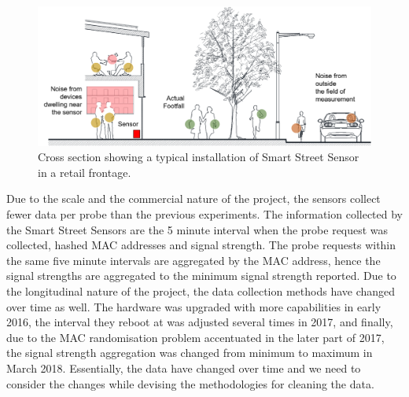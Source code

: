 \begin{figure}
  \includegraphics{images/sss.png}
  \caption{Cross section showing a typical installation of Smart Street Sensor in a retail frontage.}
  \label{figure:collection:sss:typical}
\end{figure}

Due to the scale and the commercial nature of the project, the sensors collect fewer data per probe than the previous experiments.
The information collected by the Smart Street Sensors are the 5 minute interval when the probe request was collected, hashed MAC addresses and signal strength.
The probe requests within the same five minute intervals are aggregated by the MAC address, hence the signal strengths are aggregated to the minimum signal strength reported. 
Due to the longitudinal nature of the project, the data collection methods have changed over time as well.
The hardware was upgraded with more capabilities in early 2016, the interval they reboot at was adjusted several times in 2017, and finally, due to the MAC randomisation problem accentuated in the later part of 2017, the signal strength aggregation was changed from minimum to maximum in March 2018.
Essentially, the data have changed over time and we need to consider the changes while devising the methodologies for cleaning the data.
